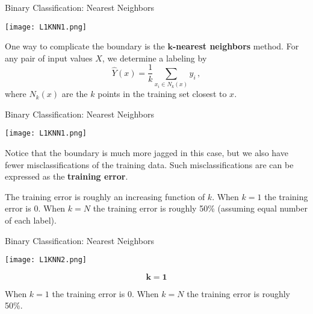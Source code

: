 \documentclass[10pt, handout]{beamer}
\begin{document}
\begin{frame}[fragile]{Binary Classification: Nearest Neighbors}
  \begin{minipage}[t][0.5\textheight][t]{\textwidth}
    \centering
     \texttt{[image: L1KNN1.png]}
  \end{minipage}
  \vfill
  \begin{minipage}[t][0.5\textheight][t]{\textwidth}

One way to complicate the boundary is the \textbf{$\mathbf k$-nearest neighbors} method. For any pair of input values $X$, we determine a labeling by
$$
\hat Y(x) = \frac{1}{k}\sum_{x_i\in N_k(x)}y_i \,,
$$
where $N_k(x)$ are the $k$ points in the training set closest to $x$. 
 \end{minipage}
\end{frame}


\begin{frame}[fragile]{Binary Classification: Nearest Neighbors}
  \begin{minipage}[t][0.5\textheight][t]{\textwidth}
    \centering
     \texttt{[image: L1KNN1.png]}
  \end{minipage}
  \vfill
  \begin{minipage}[t][0.5\textheight][t]{\textwidth}

Notice that the boundary is much more jagged in this case, but we also have fewer misclassifications of the training data. Such misclassifications are can be expressed as the \textbf{training error}. 

The training error is roughly an increasing function of $k$. When $k=1$ the training error is 0. When $k = N$ the training error is roughly 50\% (assuming equal number of each label).
 \end{minipage}
\end{frame}


\begin{frame}[fragile]{Binary Classification: Nearest Neighbors}
  \begin{minipage}[t][0.5\textheight][t]{\textwidth}
    \centering
     \texttt{[image: L1KNN2.png]}
  \end{minipage}
  \vfill
  \begin{minipage}[t][0.5\textheight][t]{\textwidth}
$$
\mathbf{k=1}
$$

When $k=1$ the training error is 0. When $k = N$ the training error is roughly 50\%.  
 \end{minipage}
\end{frame}
\end{document}

